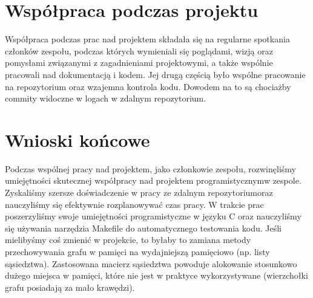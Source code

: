 \documentclass{article}
\begin{document}
\section{Współpraca podczas projektu}
Współpraca podczas prac nad projektem składała się na regularne spotkania członków zespołu, podczas których wymieniali się poglądami, wizją oraz pomysłami związanymi z zagadnieniami projektowymi, a także wspólnie pracowali nad dokumentacją i kodem. Jej drugą częścią było wspólne pracowanie na repozytorium oraz wzajemna kontrola kodu. Dowodem na to są chociażby commity widoczne w logach w zdalnym repozytorium.
\section{Wnioski końcowe}
Podczas wspólnej pracy nad projektem, jako członkowie zespołu, rozwinęliśmy umiejętności skutecznej współpracy nad projektem programistycznym\linebreak w zespole. Zyskaliśmy szersze doświadczenie w pracy ze zdalnym repozytorium\linebreak oraz nauczyliśmy się efektywnie rozplanowywać czas pracy. W trakcie prac poszerzyliśmy swoje umiejętności programistyczne w języku C oraz nauczyliśmy się używania narzędzia Makefile do automatycznego testowania kodu.
Jeśli mielibyśmy coś zmienić w projekcie, to byłaby to zamiana metody przechowywania grafu w pamięci na wydajniejszą pamięciowo (np. listy sąsiedztwa). Zastosowana macierz sąsiedztwa powoduje alokowanie stosunkowo dużego miejsca w pamięci, które nie jest w praktyce wykorzystywane (wierzchołki grafu posiadają za mało krawędzi).
\end{document}
